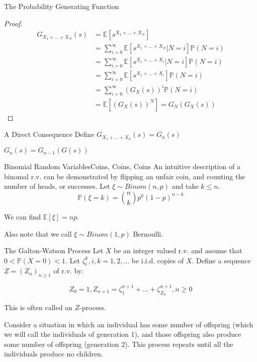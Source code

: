 \documentclass{beamer}
\begin{document}
\begin{frame}{The Probability Generating Function}
\begin{proof}
\begin{align*}
G_{X_1 + ... + X_N}(s) &= \mathbb{E}[s^{X_1 + ... + X_N}] \\
&= \sum_{i=0}^{\infty} \mathbb{E}[s^{X_1 + ... + X_N} | N = i] \mathbb{P}(N = i) \\
&= \sum_{i=0}^{\infty} \mathbb{E}[s^{X_1 + ... + X_i} | N = i] \mathbb{P}(N = i) \\
&= \sum_{i=0}^{\infty} \mathbb{E}[s^{X_1 + ... + X_i}] \mathbb{P}(N = i) \\
&= \sum_{i=0}^{\infty} (G_X(s))^i \mathbb{P}(N = i) \\
&= \mathbb{E}[(G_X(s))^N] = G_N(G_X(s))
\end{align*}
\end{proof}
\end{frame}

\begin{frame}{A Direct Consequence}
Define $G_{X_1 + ... + X_n}(s) = G_n(s)$

\pause
\vspace{10mm}
\begin{corollary}
$G_n(s) = G_{n-1}(G(s))$
\end{corollary}
\end{frame}

\begin{frame}{Binomial Random Variables}{Coins, Coins, Coins}
An intuitive description of a binomal r.v. can be demonstrated by flipping an unfair coin, and counting the number of heads, or successes. Let $\xi \sim Binom(n,p)$ and take $k \le n$.
\pause
$$\mathbb{P}(\xi = k) = {n \choose k}p^k(1-p)^{n-k}$$

\pause
We can find $\mathbb{E}[\xi] = np$.

\vspace{5 mm}
\pause
Also note that we call $\xi \sim Binom(1,p)$ Bernoulli.
\end{frame}

\begin{frame}{The Galton-Watson Process}
Let $X$ be an integer valued r.v. and assume that $0 < \mathbb{P}(X = 0) < 1$. Let $\zeta_i^k, i, k = 1, 2, ...$ be i.i.d. copies of $X$. Define a sequence $Z = (Z_n)_{n \ge 1}$ of r.v. by:

$$Z_0 = 1, Z_{n+1} = \zeta_1^{n+1} + ... + \zeta_{Z_n}^{n+1} , n \ge 0$$

This is often called an $Z$-process.

\vspace{10 mm}
\pause
Consider a situation in which an individual has some number of offspring (which we will call the individuals of generation 1), and those offspring also produce some number of offspring (generation 2). This process repeats until all the individuals produce no children.
\end{frame}
\end{document}
